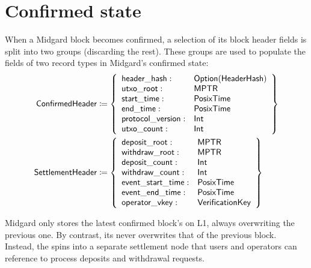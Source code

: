 \documentclass[../midgard.tex]{subfiles}
\begin{document}
\section{Confirmed state}
\label{h:confirmed-state}

\todo

When a Midgard block becomes confirmed, a selection of its block header fields is split into two groups (discarding the rest). These groups are used to populate the fields of two record types in Midgard's confirmed state:
\begingroup
\allowdisplaybreaks
\begin{align*}
    \mathsf{ConfirmedHeader} &\coloneq \left\{
    \begin{array}{ll}
        \mathsf{header\_hash} : & \mathsf{Option(HeaderHash)} \\
        \mathsf{utxo\_root} : & \mathsf{MPTR} \\
        \mathsf{start\_time} : & \mathsf{PosixTime} \\
        \mathsf{end\_time} : & \mathsf{PosixTime} \\
        \mathsf{protocol\_version} : & \mathsf{Int} \\
        \mathsf{utxo\_count} : & \mathsf{Int}
    \end{array} \right\} \\
    \mathsf{SettlementHeader} &\coloneq \left\{
    \begin{array}{ll}
        \mathsf{deposit\_root} : & \mathsf{MPTR} \\
        \mathsf{withdraw\_root} : & \mathsf{MPTR} \\
        \mathsf{deposit\_count} : & \mathsf{Int} \\
        \mathsf{withdraw\_count} : & \mathsf{Int} \\
        \mathsf{event\_start\_time}: & \mathsf{PosixTime} \\
        \mathsf{event\_end\_time}: & \mathsf{PosixTime} \\
        \mathsf{operator\_vkey} : & \mathsf{VerificationKey}
    \end{array} \right\}
\end{align*}
\endgroup

Midgard only stores the latest confirmed block's  on L1, always overwriting the previous one. By contrast, its  never overwrites that of the previous block. Instead, the  spins into a separate settlement node that users and operators can reference to process deposits and withdrawal requests.
\end{document}
